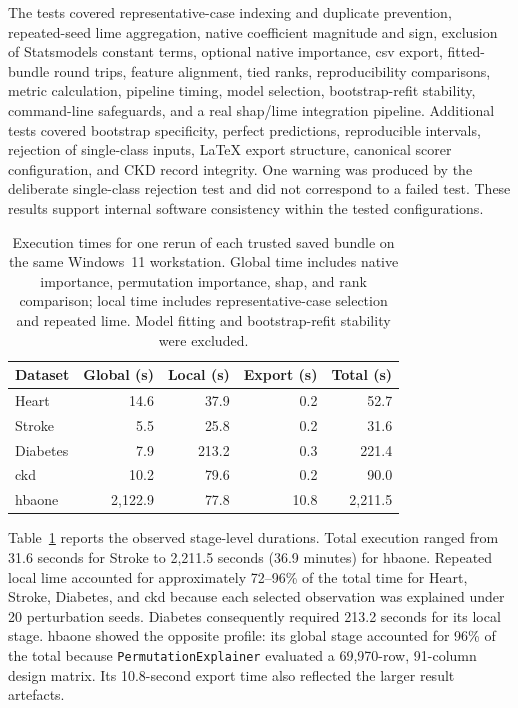 The tests covered representative-case indexing and duplicate prevention, repeated-seed \gls{lime} aggregation, native coefficient magnitude and sign, exclusion of Statsmodels constant terms, optional native importance, \gls{csv} export, fitted-bundle round trips, feature alignment, tied ranks, reproducibility comparisons, metric calculation, pipeline timing, model selection, bootstrap-refit stability, command-line safeguards, and a real \gls{shap}/\gls{lime} integration pipeline. Additional tests covered bootstrap specificity, perfect predictions, reproducible intervals, rejection of single-class inputs, LaTeX export structure, canonical scorer configuration, and CKD record integrity. One warning was produced by the deliberate single-class rejection test and did not correspond to a failed test. These results support internal software consistency within the tested configurations.

\begin{table}[htbp]
    \centering
    \small
    \setlength{\tabcolsep}{6pt}
    \caption{Execution times for one rerun of each trusted saved bundle on the same Windows~11 workstation. Global time includes native importance, permutation importance, \gls{shap}, and rank comparison; local time includes representative-case selection and repeated \gls{lime}. Model fitting and bootstrap-refit stability were excluded.}
    \label{tab:execution_times}
    \begin{tabular}{lrrrr}
        \toprule
        \textbf{Dataset} & \textbf{Global (s)} & \textbf{Local (s)} & \textbf{Export (s)} & \textbf{Total (s)} \\
        \midrule
        Heart & 14.6 & 37.9 & 0.2 & 52.7 \\
        Stroke & 5.5 & 25.8 & 0.2 & 31.6 \\
        Diabetes & 7.9 & 213.2 & 0.3 & 221.4 \\
        \gls{ckd} & 10.2 & 79.6 & 0.2 & 90.0 \\
        \gls{hbaone} & 2,122.9 & 77.8 & 10.8 & 2,211.5 \\
        \bottomrule
    \end{tabular}
\end{table}

Table~\ref{tab:execution_times} reports the observed stage-level durations. Total execution ranged from 31.6 seconds for Stroke to 2,211.5 seconds (36.9 minutes) for \gls{hbaone}. Repeated local \gls{lime} accounted for approximately 72--96\% of the total time for Heart, Stroke, Diabetes, and \gls{ckd} because each selected observation was explained under 20 perturbation seeds. Diabetes consequently required 213.2 seconds for its local stage. \gls{hbaone} showed the opposite profile: its global stage accounted for 96\% of the total because \texttt{PermutationExplainer} evaluated a 69,970-row, 91-column design matrix. Its 10.8-second export time also reflected the larger result artefacts.

